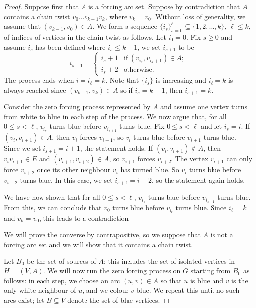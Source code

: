 \documentclass[12pt]{amsart}
\theoremstyle{plain}
\theoremstyle{definition}
\renewcommand{\subset}{\subseteq}
\begin{document}
\begin{proof}
Suppose first that $A$ is a forcing arc set. Suppose by contradiction that $A$ contains a chain twist $v_0\dots v_{k-1}v_k$, where $v_k=v_0$.
Without loss of generality, we assume that $(v_{k-1},v_0)\in A$.
We form a sequence $\{i_s\}_{s=0}^\ell\subset \{1,2,\dots,k\}$, $\ell\leq k$, of indices of vertices in the chain twist as follows. Let $i_0=0$. 
Fix $s\geq 0$ and assume $i_s$ has been defined where $i_s\leq k-1$, we set $i_{s+1}$ to be 
$$i_{s+1}= \left\{\begin{array}{rl}
    i_s+1 & \text{if } (v_{i_s},v_{i_s+1})\in A; \\
    i_s+2 & \text{otherwise.}
\end{array}\right.$$
The process ends when $i=i_\ell=k$. Note that $\{i_s\}$ is increasing and $i_\ell=k$ is always reached since $(v_{k-1},v_k)\in A$ so if $i_s=k-1$, then $i_{s+1}=k$.

 Consider the zero forcing process represented by $A$ and assume one vertex turns from white to blue in each step of the process.
We now argue that, for all $0\leq s<\ell$, $v_{i_s}$ turns blue before $v_{i_{s+1}}$ turns blue. Fix $0\leq s<\ell$ and let $i_s=i$. If $(v_i,v_{i+1})\in A$, then $v_i$ forces $v_{i+1}$, so $v_i$ turns blue before $v_{i+1}$ turns blue. Since we set $i_{s+1}=i+1$, the statement holds.
If $(v_i,v_{i+1})\not\in A$, then $v_iv_{i+1}\in E$ and $(v_{i+1},v_{i+2})\in A$, so $v_{i+1}$ forces $v_{i+2}$. The vertex $v_{i+1}$ can only force $v_{i+2}$ once its other neighbour $v_i$ has turned blue. So $v_i$ turns blue before $v_{i+2}$ turns blue.
In this case, we set $i_{s+1}=i+2$, so the statement again holds. 

We have now shown that for all $0\leq s<\ell$, $v_{i_s}$ turns blue before $v_{i_{s+1}}$ turns blue. 
From this, we can conclude that $v_0$ turns blue before $v_{i_\ell}$ turns blue. Since $i_\ell=k$ and $v_k=v_0$, this leads to a contradiction.





We will prove the converse by contrapositive, so we suppose that $A$ is not a forcing arc set and we will show that it contains a chain twist. 

Let $B_0$ be the set of sources of $A$; this includes the set of isolated vertices in $H = (V, A)$. We will now run the zero forcing process on $G$ starting from $B_0$ as follows: in each step, we choose an arc $(u,v)\in A$ so that $u$ is blue and $v$ is the only white neighbour of $u$, and we colour $v$ blue. 
We repeat this until no such arcs exist; let $B\subset V$ denote the set of blue vertices. 


\end{proof}
\end{document}
